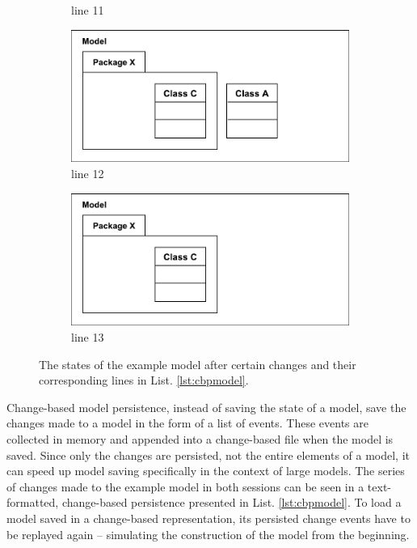 \documentclass[10pt,conference]{IEEEtran}
\begin{document}
\begin{figure}[ht]
\begin{subfigure}[t]{0.49\linewidth}
        \caption{line 11 }
        \label{fig:illustration_6}
    \end{subfigure}
    \begin{subfigure}[t]{0.49\linewidth}
        \centering
        \includegraphics[width=\linewidth]{images/illustration_7}
        \caption{line 12}
        \label{fig:illustration_7}
    \end{subfigure}
    \hfill
    \begin{subfigure}[t]{0.49\linewidth}
        \centering
        \includegraphics[width=\linewidth]{images/illustration_8}
        \caption{line 13}
        \label{fig:illustration_8}
    \end{subfigure}
    
    \caption{The states of the example model after certain changes and their corresponding lines in List. \ref{lst:cbpmodel}.}
    \label{fig:illustration_cbp}
\end{figure}



Change-based model persistence, instead of saving the state of a model, save the changes made to a model in the form of a list of events. These events are collected in memory and appended into a change-based file when the model is saved. Since only the changes are persisted, not the entire elements of a model, it can speed up model saving specifically in the context of large models. The series of changes made to the example model in both sessions can be seen in a text-formatted, change-based persistence presented in List. \ref{lst:cbpmodel}. To load a model saved in a change-based representation, its persisted change events have to be replayed again -- simulating the construction of the model from the beginning.
\end{document}
